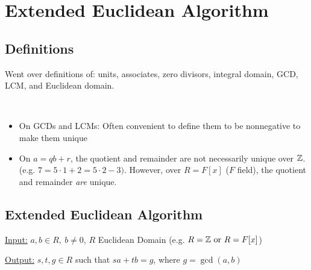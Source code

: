 \section{Extended Euclidean Algorithm}

\subsection{Definitions}
Went over definitions of: units, associates, zero divisors, integral domain, GCD, LCM, and Euclidean domain.

\begin{note}
    ~
    \begin{itemize}
        \item On GCDs and LCMs: Often convenient to define them to be nonnegative to make them unique
        \item On $a = qb + r$, the quotient and remainder are not necessarily unique over $\mathbb{Z}$. (e.g. $7 = 5 \cdot 1 + 2 = 5 \cdot 2 - 3)$. However, over $R = F[x]$ ($F$ field), the quotient and remainder \textit{are} unique.
    \end{itemize}
\end{note}

\subsection{Extended Euclidean Algorithm}
\underline{Input:} $a, b \in R, \ b \neq 0$, $R$ Euclidean Domain (e.g. $R = \mathbb{Z} \text{ or } R = F[x]$)

\underline{Output:} $s,t,g \in R$ such that $sa + tb = g$, where $g = \gcd(a,b)$

